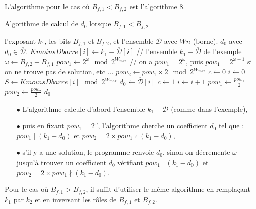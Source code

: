 \documentclass[12pt, a4paper]{memoir}
\newcommand{\dbarre}{\overline{\mathcal{D}}}
\begin{document}
L'algorithme pour le cas où $B_{f,1} < B_{f,2}$ est l'algorithme $8$.
\begin{algorithm}
 \caption{Algorithme de calcul de $d_0$ lorsque $B_{f,1} < B_{f,2}$}
 \begin{algorithmic}
  \REQUIRE l'exposant $k_1$, les bits $B_{f,1}$ et $B_{f,2}$, et l'ensemble $\dbarre$ avec $Wn$ (borne).
  \ENSURE $d_0$ avec $d_0 \in \dbarre$.
  \FOR{$i$ allant de $0$ à $|\dbarre| - 1$}
  \STATE $KmoinsDbarre[i] \leftarrow k_1 - \dbarre[i]$ // l'ensemble $k_1 - \dbarre$ de l'exemple
  \ENDFOR
  \STATE $\omega \leftarrow B_{f,2} - B_{f,1}$
  \STATE $pow_1 \leftarrow 2^{\omega} \mod 2^{W_{max}}$ // on a $pow_1 = 2^{\omega}$, puis $pow_1 = 2^{\omega-1}$ si on ne trouve pas de solution, etc ...
  \STATE $pow_2 \leftarrow pow_1 \times 2 \mod 2^{W_{max}}$
  \STATE $c \leftarrow 0$
  \STATE $i \leftarrow 0$
  \WHILE{$i < |\dbarre|$ et $c = 0$}
  \STATE $S \leftarrow KmoinsDbarre[i] \mod 2^{W_{max}}$
  \STATE $d_0 \leftarrow \dbarre[i]$
  \STATE $c \leftarrow 1$
  \ENDIF
  \STATE $i \leftarrow i+1$
  \ENDWHILE
  \STATE $pow_1 \leftarrow \frac{pow_1}{2}$
  \STATE $pow_2 \leftarrow \frac{pow_2}{2}$
  \ENDWHILE
  \RETURN $d_0$
 \end{algorithmic}
\end{algorithm}

\begin{itemize}
 \item [$\bullet$] L'algorithme calcule d'abord l'ensemble $k_1 - \dbarre$ (comme dans l'exemple),
 \item [$\bullet$] puis en fixant $pow_1 = 2^\omega$, l'algorithme cherche un coefficient $d_0$ tel que : \\
 $pow_1 \mid (k_1 - d_0)$ et $pow_2 = 2 \times pow_1 \nmid (k_1 - d_0)$,
 \item [$\bullet$] s'il y a une solution, le programme renvoie $d_0$, sinon on décremente $\omega$ jusqu'à
 trouver un coefficient $d_0$ vérifiant $pow_1 \mid (k_1 - d_0)$ et $pow_2 = 2 \times pow_1 \nmid (k_1 - d_0)$.
\end{itemize}



Pour le cas où $B_{f,1} > B_{f,2}$, il suffit d'utiliser le même algorithme en remplaçant $k_1$ par $k_2$
et en inversant les rôles de $B_{f,1}$ et $B_{f,2}$. \newpage
\end{document}
